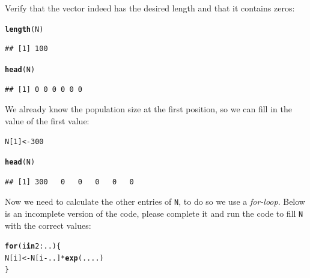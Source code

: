 \documentclass{article}\usepackage[]{graphicx}\usepackage[]{color}
\makeatletter
\newcommand{\hlnum}[1]{\textcolor[rgb]{0.686,0.059,0.569}{#1}}%
\newcommand{\hlopt}[1]{\textcolor[rgb]{0,0,0}{#1}}%
\newcommand{\hlstd}[1]{\textcolor[rgb]{0.345,0.345,0.345}{#1}}%
\newcommand{\hlkwa}[1]{\textcolor[rgb]{0.161,0.373,0.58}{\textbf{#1}}}%
\newcommand{\hlkwb}[1]{\textcolor[rgb]{0.69,0.353,0.396}{#1}}%
\newcommand{\hlkwd}[1]{\textcolor[rgb]{0.737,0.353,0.396}{\textbf{#1}}}%
\newenvironment{kframe}{%
 \def\at@end@of@kframe{}%
 \ifinner\ifhmode%
  \def\at@end@of@kframe{\end{minipage}}%
  \begin{minipage}{\columnwidth}%
 \fi\fi%
 \def\FrameCommand##1{\hskip\@totalleftmargin \hskip-\fboxsep
 \colorbox{shadecolor}{##1}\hskip-\fboxsep
     \hskip-\linewidth \hskip-\@totalleftmargin \hskip\columnwidth}%
 \MakeFramed {\advance\hsize-\width
   \@totalleftmargin\z@ \linewidth\hsize
   \@setminipage}}%
 {\par\unskip\endMakeFramed%
 \at@end@of@kframe}
\newenvironment{knitrout}{}{} %
\makeatother
\begin{document}
Verify that the vector indeed has the desired length and that it contains zeros: 
\begin{knitrout}
\color{fgcolor}\begin{kframe}
\begin{alltt}
\hlkwd{length}\hlstd{(N)}
\end{alltt}
\begin{verbatim}
## [1] 100
\end{verbatim}
\begin{alltt}
\hlkwd{head}\hlstd{(N)}
\end{alltt}
\begin{verbatim}
## [1] 0 0 0 0 0 0
\end{verbatim}
\end{kframe}
\end{knitrout}
We already know the population size at the first position, so we can fill in the value of the first value:
\begin{knitrout}
\color{fgcolor}\begin{kframe}
\begin{alltt}
\hlstd{N[}\hlnum{1}\hlstd{]} \hlkwb{<-} \hlnum{300}

\hlkwd{head}\hlstd{(N)}
\end{alltt}
\begin{verbatim}
## [1] 300   0   0   0   0   0
\end{verbatim}
\end{kframe}
\end{knitrout}
Now we need to calculate the other entries of \texttt{N}, to do so we use a \textit{for-loop}. Below is an incomplete version of the code, please complete it and run the code to fill \texttt{N} with the correct values:
\begin{knitrout}
\color{fgcolor}\begin{kframe}
\begin{alltt}
\hlkwa{for}\hlstd{(i} \hlkwa{in} \hlnum{2}\hlopt{:}\hlstd{..)\{}
  \hlstd{N[i]} \hlkwb{<-} \hlstd{N[i}\hlopt{-}\hlstd{..]} \hlopt{*} \hlkwd{exp}\hlstd{(....)}
\hlstd{\}}
\end{alltt}
\end{kframe}
\end{knitrout}
\end{document}
